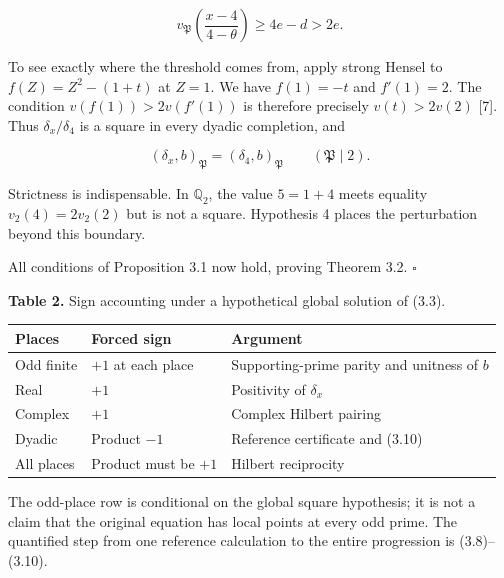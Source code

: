 \documentclass[11pt,a4paper]{article}
\newcounter{none}
\begin{document}
\[
v_{\mathfrak P}\!\left(\frac{x-4}{4-\theta}\right)
\ge4e-d>2e.
\tag{3.9}
\]

To see exactly where the threshold comes from, apply strong Hensel to
\(f(Z)=Z^2-(1+t)\) at \(Z=1\). We have \(f(1)=-t\) and \(f'(1)=2\). The
condition \(v(f(1))>2v(f'(1))\) is therefore precisely \(v(t)>2v(2)\)
{[}7{]}. Thus \(\delta_x/\delta_4\) is a square in every dyadic
completion, and

\[
(\delta_x,b)_{\mathfrak P}
=(\delta_4,b)_{\mathfrak P}
\qquad(\mathfrak P\mid2).
\tag{3.10}
\]

Strictness is indispensable. In \(\mathbb Q_2\), the value \(5=1+4\)
meets equality \(v_2(4)=2v_2(2)\) but is not a square. Hypothesis 4
places the perturbation beyond this boundary.

All conditions of Proposition 3.1 now hold, proving Theorem 3.2.
\(\square\)

\textbf{Table 2.} Sign accounting under a hypothetical global solution
of (3.3).

{\def\LTcaptype{none} %
\begin{longtable}[]{@{}
  >{\raggedright\arraybackslash}p{}
  >{\centering\arraybackslash}p{}
  >{\raggedright\arraybackslash}p{}@{}}
\toprule\noalign{}
\begin{minipage}[b]{\linewidth}\raggedright
Places
\end{minipage} & \begin{minipage}[b]{\linewidth}\centering
Forced sign
\end{minipage} & \begin{minipage}[b]{\linewidth}\raggedright
Argument
\end{minipage} \\
\midrule\noalign{}
\endhead
\bottomrule\noalign{}
\endlastfoot
Odd finite & \(+1\) at each place & Supporting-prime parity and unitness
of \(b\) \\
Real & \(+1\) & Positivity of \(\delta_x\) \\
Complex & \(+1\) & Complex Hilbert pairing \\
Dyadic & Product \(-1\) & Reference certificate and (3.10) \\
All places & Product must be \(+1\) & Hilbert reciprocity \\
\end{longtable}
}

The odd-place row is conditional on the global square hypothesis; it is
not a claim that the original equation has local points at every odd
prime. The quantified step from one reference calculation to the entire
progression is (3.8)--(3.10).
\end{document}
